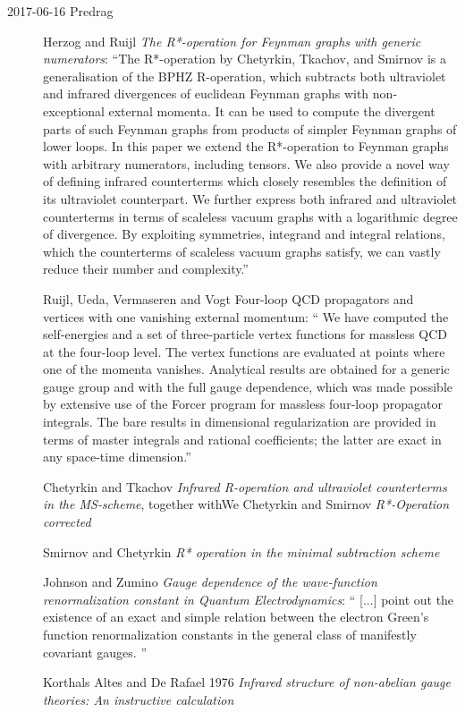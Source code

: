 \begin{description}
\item[2017-06-16 Predrag]
Herzog and Ruijl
{\em The {R*}-operation for {Feynman} graphs with generic numerators}:
``The R*-operation by Chetyrkin, Tkachov, and Smirnov is a generalisation
of the BPHZ R-operation, which subtracts both ultraviolet and infrared
divergences of euclidean Feynman graphs with non-exceptional external
momenta. It can be used to compute the divergent parts of such Feynman
graphs from products of simpler Feynman graphs of lower loops. In this
paper we extend the R*-operation to Feynman graphs with arbitrary
numerators, including tensors. We also provide a novel way of defining
infrared counterterms which closely resembles the definition of its
ultraviolet counterpart. We further express both infrared and ultraviolet
counterterms in terms of scaleless vacuum graphs with a logarithmic
degree of divergence. By exploiting symmetries, integrand and integral
relations, which the counterterms of scaleless vacuum graphs satisfy, we
can vastly reduce their number and complexity.''

Ruijl, Ueda, Vermaseren and Vogt {Four-loop {QCD}
propagators and vertices with one vanishing external momentum}: `` We
have computed the self-energies and a set of three-particle vertex
functions for massless QCD at the four-loop level. The vertex functions
are evaluated at points where one of the momenta vanishes. Analytical
results are obtained for a generic gauge group and with the full gauge
dependence, which was made possible by extensive use of the Forcer
program for massless four-loop propagator integrals. The bare results
in dimensional regularization are provided in terms of master integrals
and rational coefficients; the latter are exact in any space-time
dimension.''

Chetyrkin and Tkachov {\em Infrared {R}-operation and
ultraviolet counterterms in the {MS}-scheme}, together withWe
Chetyrkin and Smirnov
{\em {R*}-Operation corrected}

Smirnov and Chetyrkin
{\em {R*} operation in the minimal subtraction scheme}

Johnson and Zumino {\em Gauge dependence of the
wave-function renormalization constant in {Quantum Electrodynamics}}: ``
[...] point out the existence of an exact and simple relation between the
electron Green's function renormalization constants in the general class
of manifestly covariant gauges.
''

Korthals Altes and De Rafael 1976
{\em Infrared structure of non-abelian gauge theories:
     {An} instructive calculation}


\end{description}
